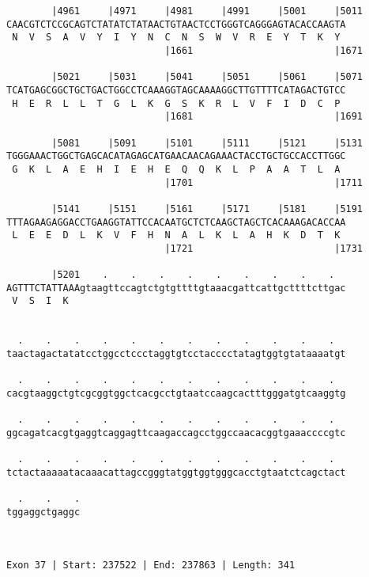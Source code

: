 \documentclass{article}
\begin{document}
\begin{Verbatim}
        |4961     |4971     |4981     |4991     |5001     |5011
CAACGTCTCCGCAGTCTATATCTATAACTGTAACTCCTGGGTCAGGGAGTACACCAAGTA
 N  V  S  A  V  Y  I  Y  N  C  N  S  W  V  R  E  Y  T  K  Y 
                            |1661                         |1671
  
        |5021     |5031     |5041     |5051     |5061     |5071
TCATGAGCGGCTGCTGACTGGCCTCAAAGGTAGCAAAAGGCTTGTTTTCATAGACTGTCC
 H  E  R  L  L  T  G  L  K  G  S  K  R  L  V  F  I  D  C  P 
                            |1681                         |1691
  
        |5081     |5091     |5101     |5111     |5121     |5131
TGGGAAACTGGCTGAGCACATAGAGCATGAACAACAGAAACTACCTGCTGCCACCTTGGC
 G  K  L  A  E  H  I  E  H  E  Q  Q  K  L  P  A  A  T  L  A 
                            |1701                         |1711
  
        |5141     |5151     |5161     |5171     |5181     |5191
TTTAGAAGAGGACCTGAAGGTATTCCACAATGCTCTCAAGCTAGCTCACAAAGACACCAA
 L  E  E  D  L  K  V  F  H  N  A  L  K  L  A  H  K  D  T  K 
                            |1721                         |1731
  
        |5201    .    .    .    .    .    .    .    .    .  
AGTTTCTATTAAAgtaagttccagtctgtgttttgtaaacgattcattgcttttcttgac
 V  S  I  K                                                 
                                                            
  
  .    .    .    .    .    .    .    .    .    .    .    .  
taactagactatatcctggcctccctaggtgtcctacccctatagtggtgtataaaatgt
                                                            
  .    .    .    .    .    .    .    .    .    .    .    .  
cacgtaaggctgtcgcggtggctcacgcctgtaatccaagcactttgggatgtcaaggtg
                                                            
  .    .    .    .    .    .    .    .    .    .    .    .  
ggcagatcacgtgaggtcaggagttcaagaccagcctggccaacacggtgaaaccccgtc
                                                            
  .    .    .    .    .    .    .    .    .    .    .    .  
tctactaaaaatacaaacattagccgggtatggtggtgggcacctgtaatctcagctact
                                                            
  .    .    .
tggaggctgaggc
             
             
 
Exon 37 | Start: 237522 | End: 237863 | Length: 341




\end{Verbatim}
\end{document}
